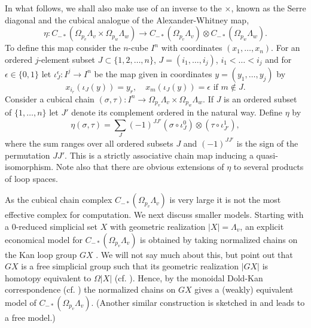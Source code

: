 \documentclass{gtpart}
\begin{document}
In what follows, we shall also make use of an inverse to the $\times$, known as the
Serre diagonal \cite{serre} and the cubical analogue of the Alexander-Whitney map,
\[ \eta\colon  C_{-*}(\Omega_{p_v} \Lambda_v \times \Omega_{p_w} \Lambda_w)
\to C_{-*}(\Omega_{p_v} \Lambda_v) \otimes C_{-*}(\Omega_{p_w} \Lambda_w).\]
To define this map consider the $n$-cube $I^{n}$ with coordinates $(x_{1},\dots,x_{n})$. For an
ordered $j$-element subset $J\subset\{1,2,\dots,n\}$, $J=(i_{1},\dots,i_{j})$, $i_{1}<\dots<i_{j}$
and for $\epsilon\in \{0,1 \}$ let $\iota^{\epsilon}_{J}\colon I^{j}\to I^{n}$ be the map given in
coordinates $y= (y_1,\ldots, y_j)$ by
\[ 
x_{i_{r}}(\iota_{J}(y))=y_{r},\quad x_{m}(\iota_{J}(y))=\epsilon \text{ if } m\notin J.
\] 
Consider a cubical chain $(\sigma,\tau) \colon I^n \to  \Omega_{p_v} \Lambda_v \times \Omega_{p_w} \Lambda_w$.  If $J$ is an ordered subset of $\{1,\dots,n\}$ let $J'$ denote its complement ordered in the natural way. Define $\eta$ by
\[ 
\eta(\sigma,\tau) = \sum_{J} (-1)^{JJ'}(\sigma\circ\iota_{J}^{0})  \otimes
(\tau\circ \iota_{J'}^{1}),
\]
where the sum ranges over all ordered subsets $J$ and $(-1)^{JJ'}$ is the sign of the permutation $JJ'$. 
This is a strictly associative chain map inducing a quasi-isomorphism. Note also that there are obvious extensions of $\eta$ to several products of loop spaces.

As the cubical chain complex $C_{-*}(\Omega_{p_v}\Lambda_v)$ is very large it is not the most effective complex for computation. We next discuss smaller models. Starting with a 0-reduced simplicial set $X$ with geometric realization
$|X|=\Lambda_v$, an explicit economical model for $C_{-*}(\Omega_{p_v} \Lambda_v)$ is obtained
by taking normalized chains on the Kan loop group $GX$ \cite{Kan}. We will not say much about this, but point out that $GX$ is a free simplicial group such that its geometric realization $|GX|$ is
homotopy equivalent to $\Omega |X|$ (cf. \cite[Corollary 5.11]{GJ}). Hence, by the monoidal Dold-Kan
correspondence (cf. \cite{SS}) the normalized
chains on $GX$ gives a (weakly) equivalent model of $C_{-*}(\Omega_{p_v} \Lambda_v)$. (Another similar construction is sketched in \cite{Kontsevich} and leads to a free model.)
\end{document}
